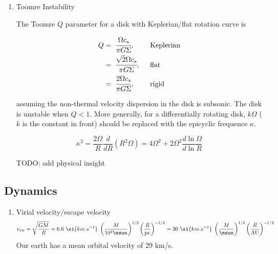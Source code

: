 \begin{enumerate}
\item Toomre Instability
\label{sec:orgefcc514}

The Toomre \(Q\) parameter for a disk with Keplerian/flat rotation curve is

\begin{align*}
Q&=\;\cfrac{\Omega c_s}{\pi G \Sigma} ,  \;\; &&{\rm Keplerian}\\
  &=\;\cfrac{\sqrt{2} \Omega c_s}{\pi G \Sigma},\;\; &&{\rm flat} \\
  &=\;\cfrac{2 \Omega c_s}{\pi G \Sigma},\;\; &&{\rm rigid}
\end{align*}

assuming the non-thermal velocity dispersion in the disk is subsonic. The disk is unstable when \(Q < 1\). More generally, for a differentially rotating disk, \(k \Omega\) (\(k\) is the constant in front) should be replaced with the epicyclic frequence \(\kappa\).

$$
\kappa^2 = \frac{2\Omega}{R} \frac{d}{dR}(R^2 \Omega) =
4 \Omega^2 + 2 \Omega^2 \frac{d \ln \Omega}{d \ln R}
$$

TODO: add physical insight
\end{enumerate}

\subsection{Dynamics}
\label{sec:org97cc184}

\begin{enumerate}
\item Virial velocity/escape velocity
\label{sec:orgbe657d6}
$$\label{eq:vvir}
  v_{\rm vir} = \sqrt{\frac{GM}{R}} = 6.6~\si{km.s^{-1}} \; \left(\frac{M}{10^4 \msun}\right)^{1/2} \left(\frac{R}{{\rm pc}}\right)^{-1/2} = 30~\si{km.s^{-1}} \; \left(\frac{M}{\msun}\right)^{1/2} \left(\frac{R}{{\rm AU}}\right)^{-1/2}$$
  Our earth has a mean orbital velocity of 29 km/s.
\end{enumerate}

